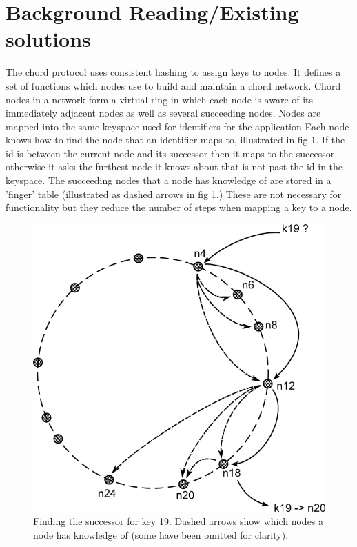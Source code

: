 \documentclass{article}
\begin{document}
\section{Background Reading/Existing solutions}
The chord protocol \cite{chord} uses consistent hashing to assign keys to nodes. It defines a set of functions which nodes use to build and maintain a chord network. Chord nodes in a network form a virtual ring in which each node is aware of its immediately adjacent nodes as well as several succeeding nodes.
Nodes are mapped into the same keyspace used for identifiers for the application
Each node knows how to find the node that an identifier maps to, illustrated in fig 1. If the id is between the current node and its successor then it maps to the successor, otherwise it asks the furthest node it knows about that is not past the id in the keyspace. The succeeding nodes that a node has knowledge of are stored in a 'finger' table (illustrated as dashed arrows in fig 1.) These are not necessary for functionality but they reduce the number of steps when mapping a key to a node.
\begin{figure}
\centering
\includegraphics{chord_find-successor.png}
\caption{Finding the successor for key 19. Dashed arrows show which nodes a node has knowledge of (some have been omitted for clarity).}
\end{figure}
\end{document}
